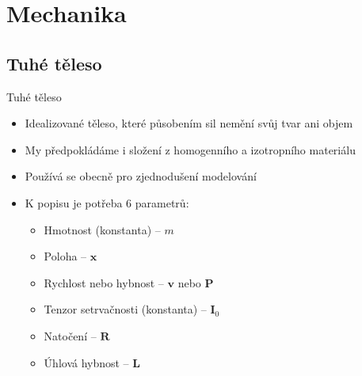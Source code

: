 \documentclass[aspectratio=169,xcolor=dvipsnames]{beamer}
\begin{document}
\section{Mechanika}
\subsection{Tuhé těleso}
\begin{frame}{Tuhé těleso}
  \begin{itemize}
    \item Idealizované těleso, které působením sil nemění svůj tvar ani objem
    \item My předpokládáme i složení z homogenního a izotropního materiálu
    \item Používá se obecně pro zjednodušení modelování
      \vspace{0.5cm}
    \item K popisu je potřeba 6 parametrů:
      \begin{itemize}
        \item Hmotnost (konstanta) -- $m$
        \item Poloha -- $\mathbf{x}$
        \item Rychlost nebo hybnost -- $\mathbf{v}$ nebo $\mathbf{P}$
          \vspace{0.25cm}
        \item Tenzor setrvačnosti (konstanta) -- $\mathbf{I}_0$
        \item Natočení -- $\mathbf{R}$
        \item Úhlová hybnost -- $\mathbf{L}$
      \end{itemize}
      \vspace{0.25cm}
      \cite{witkin1997}
      \cite{hecker1997}
      \cite{blackedout01_rigid_body}
      \cite{kopcil_trejbalova}
  \end{itemize}
\end{frame}
\end{document}
